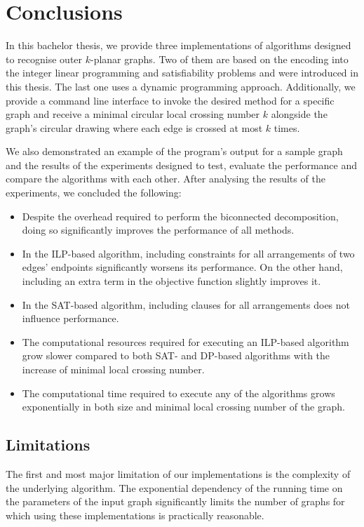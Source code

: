 \chapter{Conclusions}\label{ch:conclusions}

In this bachelor thesis, we provide three implementations of algorithms designed to recognise outer \(k\)-planar graphs. Two of them are based on the encoding into the integer linear programming and satisfiability problems and were introduced in this thesis. The last one uses a dynamic programming approach. Additionally, we provide a command line interface to invoke the desired method for a specific graph and receive a minimal circular local crossing number \(k\) alongside the graph's circular drawing where each edge is crossed at most \(k\) times.

We also demonstrated an example of the program's output for a sample graph and the results of the experiments designed to test, evaluate the performance and compare the algorithms with each other. After analysing the results of the experiments, we concluded the following:
\begin{itemize}
    \item Despite the overhead required to perform the biconnected decomposition, doing so significantly improves the performance of all methods.
    \item In the ILP-based algorithm, including constraints for all arrangements of two edges' endpoints significantly worsens its performance. On the other hand, including an extra term in the objective function slightly improves it.
    \item In the SAT-based algorithm, including clauses for all arrangements does not influence performance.
    \item The computational resources required for executing an ILP-based algorithm grow slower compared to both SAT- and DP-based algorithms with the increase of minimal local crossing number.
    \item The computational time required to execute any of the algorithms grows exponentially in both size and minimal local crossing number of the graph.
\end{itemize}

\section{Limitations}

The first and most major limitation of our implementations is the complexity of the underlying algorithm. The exponential dependency of the running time on the parameters of the input graph significantly limits the number of graphs for which using these implementations is practically reasonable.

